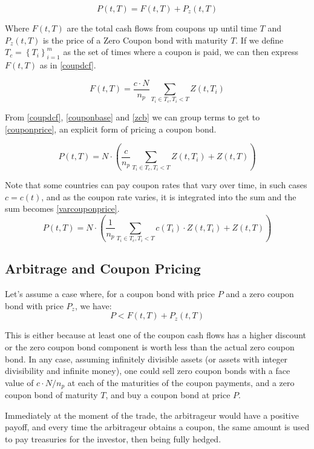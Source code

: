 \documentclass[10pt,letterpaper]{article}
\begin{document}
\begin{equation}\label{couponbase}
P(t,T) = F(t,T) + P_z(t, T)
\end{equation}

Where $F(t,T)$ are the total cash flows from coupons up until time $T$ and $P_z(t, T)$ is the price of a Zero Coupon bond with maturity $T$. If we define $T_c = \left\lbrace T_i \right\rbrace_{i=1}^m$ as the set of times where a coupon is paid, we can then express $F(t,T)$ as in \eqref{coupdcf}.

\begin{equation}\label{coupdcf}
F(t,T) = \frac{c\cdot N}{n_p}\sum_{T_i \in T_c, T_i < T}Z(t, T_i)
\end{equation}

From \eqref{coupdcf}, \eqref{couponbase} and \eqref{zcb} we can group terms to get to \eqref{couponprice}, an explicit form of pricing a coupon bond.

\begin{equation}\label{couponprice}
P(t,T) = N \cdot \left(\frac{c}{n_p}\sum_{T_i \in T_c, T_i < T}Z(t, T_i) + Z(t,T)\right)
\end{equation}

Note that some countries can pay coupon rates that vary over time, in such cases $c=c(t)$, and as the coupon rate varies, it is integrated into the sum and the sum becomes \eqref{varcouponprice}.
\begin{equation}\label{varcouponprice}
P(t,T) = N \cdot \left(\frac{1}{n_p}\sum_{T_i \in T_c, T_i < T}c(T_i)\cdot Z(t, T_i) + Z(t,T)\right)
\end{equation}

\subsection{Arbitrage and Coupon Pricing}
Let's assume a case where, for a coupon bond with price $P$ and a zero coupon bond with price $P_z$, we have:
$$P < F(t,T) + P_z(t, T)$$

This is either because at least one of the coupon cash flows has a higher discount or the zero coupon bond component is worth less than the actual zero coupon bond. In any case, assuming infinitely divisible assets (or assets with integer divisibility and infinite money), one could sell zero coupon bonds with a face value of $c\cdot N/n_p$ at each of the maturities of the coupon payments, and a zero coupon bond of maturity $T$, and buy a coupon bond at price $P$.

Immediately at the moment of the trade, the arbitrageur would have a positive payoff, and every time the arbitrageur obtains a coupon, the same amount is used to pay treasuries for the investor, then being fully hedged.
\end{document}
